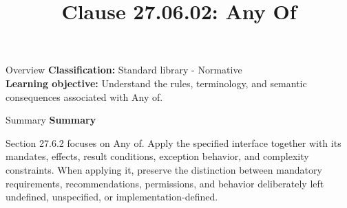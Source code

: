 \documentclass[10pt,letterpaper]{article}
\title{Clause 27.06.02: Any Of}
\author{}
\date{}
\begin{document}
\maketitle
\begin{CornellOverviewBox}{Overview}
\textbf{Classification:} Standard library - Normative\\[2pt]
\textbf{Learning objective:} Understand the rules, terminology, and semantic consequences associated with Any of.
\end{CornellOverviewBox}\begin{CornellSummaryBox}{Summary}
{\sffamily\bfseries\color{Accent} Summary}\par\vspace{3pt}Section 27.6.2 focuses on Any of. Apply the specified interface together with its mandates, effects, result conditions, exception behavior, and complexity constraints. When applying it, preserve the distinction between mandatory requirements, recommendations, permissions, and behavior deliberately left undefined, unspecified, or implementation-defined.
\end{CornellSummaryBox}
\end{document}
